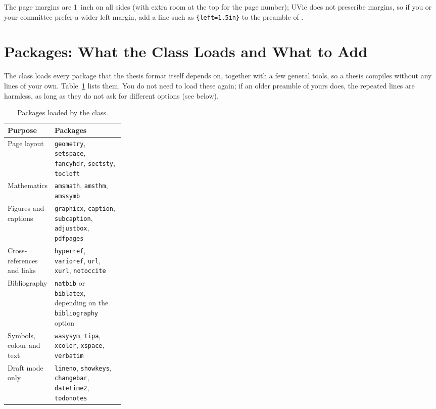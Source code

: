 The page margins are 1~inch on all sides (with extra room at the top for the page number); UVic does not prescribe margins, so if you or your committee prefer a wider left margin, add a line such as \texttt{\{left=1.5in\}} to the preamble of .

\section{Packages: What the Class Loads and What to Add}
\label{sec:packages}

The class loads every package that the thesis format itself depends on, together with a few general tools, so a thesis compiles without any  lines of your own. Table~\ref{tab:class-packages} lists them. You do not need to load these again; if an older preamble of yours does, the repeated lines are harmless, as long as they do not ask for different options (see below).

\begin{table}[htbp]
    \centering
    \caption{Packages loaded by the class.}
    \label{tab:class-packages}
    \begin{tabularx}{\linewidth}{@{}>{\raggedright\arraybackslash}p{0.27\linewidth} >{\raggedright\arraybackslash}X@{}}
        \toprule
        Purpose & Packages \\
        \midrule
        Page layout & \texttt{geometry}, \texttt{setspace}, \texttt{fancyhdr}, \texttt{sectsty}, \texttt{tocloft} \\
        Mathematics & \texttt{amsmath}, \texttt{amsthm}, \texttt{amssymb} \\
        Figures and captions & \texttt{graphicx}, \texttt{caption}, \texttt{subcaption}, \texttt{adjustbox}, \texttt{pdfpages} \\
        Cross-references and links & \texttt{hyperref}, \texttt{varioref}, \texttt{url}, \texttt{xurl}, \texttt{notoccite} \\
        Bibliography & \texttt{natbib} or \texttt{biblatex}, depending on the \texttt{bibliography} option \\
        Symbols, colour and text & \texttt{wasysym}, \texttt{tipa}, \texttt{xcolor}, \texttt{xspace}, \texttt{verbatim} \\
        Draft mode only & \texttt{lineno}, \texttt{showkeys}, \texttt{changebar}, \texttt{datetime2}, \texttt{todonotes} \\
        \bottomrule
    \end{tabularx}
\end{table}

